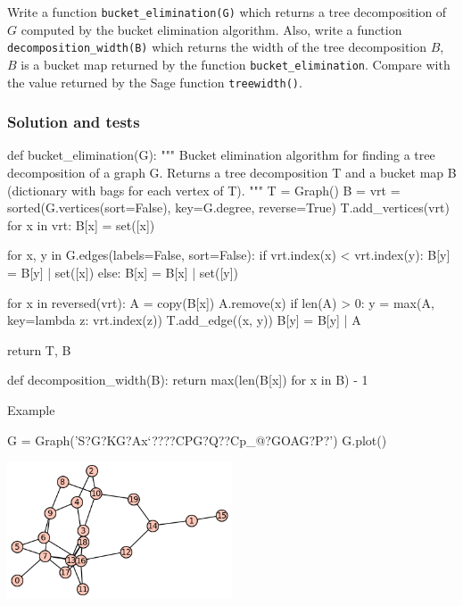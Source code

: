 Write a function \verb`bucket_elimination(G)` which returns a tree decomposition of $G$ computed by the bucket elimination algorithm.
Also, write a function \verb`decomposition_width(B)` which returns the width of the tree decomposition $B$, $B$ is a bucket map returned by the function \verb`bucket_elimination`. Compare with the value returned by the Sage function \verb`treewidth()`.

\subsubsection*{Solution and tests}
\begin{sageCell}
def bucket_elimination(G):
    """
    Bucket elimination algorithm for finding a tree decomposition of a graph G.
    Returns a tree decomposition T and a bucket map B (dictionary with bags for each vertex of T).
    """
    T = Graph()
    B = {}
    vrt = sorted(G.vertices(sort=False), key=G.degree, reverse=True)
    T.add_vertices(vrt)
    for x in vrt:
        B[x] = set([x])

    for x, y in G.edges(labels=False, sort=False):
        if vrt.index(x) < vrt.index(y):
            B[y] = B[y] | set([x])
        else:
            B[x] = B[x] | set([y])

    for x in reversed(vrt):
        A = copy(B[x])
        A.remove(x)
        if len(A) > 0:
            y = max(A, key=lambda z: vrt.index(z))
            T.add_edge((x, y))
            B[y] = B[y] | A

    return T, B
\end{sageCell}

\begin{sageCell}
def decomposition_width(B):
    return max(len(B[x]) for x in B) - 1
\end{sageCell}
Example
\begin{sageCell}
    G = Graph('S?G?KG?Ax`????CPG?Q??Cp_@?GOAG?P?')
    G.plot()
\end{sageCell}
\begin{outImage}
    \includegraphics[width=0.5\textwidth]{Images/TreeDecomposition/bucket_elimination_graph.png}
\end{outImage}


